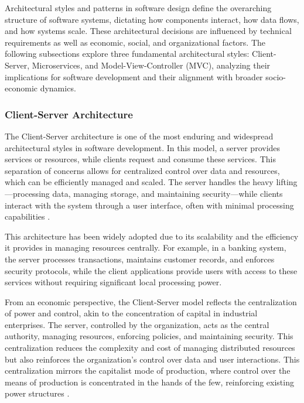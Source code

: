 \begin{refsection}
Architectural styles and patterns in software design define the overarching structure of software systems, dictating how components interact, how data flows, and how systems scale. These architectural decisions are influenced by technical requirements as well as economic, social, and organizational factors. The following subsections explore three fundamental architectural styles: Client-Server, Microservices, and Model-View-Controller (MVC), analyzing their implications for software development and their alignment with broader socio-economic dynamics.

\subsubsection{Client-Server Architecture}

The Client-Server architecture is one of the most enduring and widespread architectural styles in software development. In this model, a server provides services or resources, while clients request and consume these services. This separation of concerns allows for centralized control over data and resources, which can be efficiently managed and scaled. The server handles the heavy lifting—processing data, managing storage, and maintaining security—while clients interact with the system through a user interface, often with minimal processing capabilities \cite[pp.~58-60]{Bass2021}.

This architecture has been widely adopted due to its scalability and the efficiency it provides in managing resources centrally. For example, in a banking system, the server processes transactions, maintains customer records, and enforces security protocols, while the client applications provide users with access to these services without requiring significant local processing power.

From an economic perspective, the Client-Server model reflects the centralization of power and control, akin to the concentration of capital in industrial enterprises. The server, controlled by the organization, acts as the central authority, managing resources, enforcing policies, and maintaining security. This centralization reduces the complexity and cost of managing distributed resources but also reinforces the organization's control over data and user interactions. This centralization mirrors the capitalist mode of production, where control over the means of production is concentrated in the hands of the few, reinforcing existing power structures \cite[pp.~45-48]{Gamma2015}.


\end{refsection}
